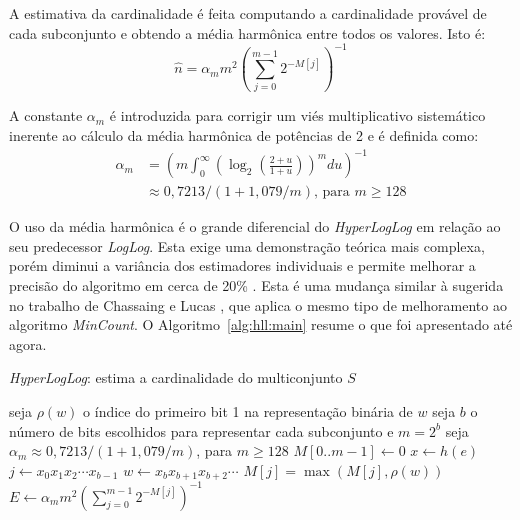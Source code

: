 A estimativa da cardinalidade é feita computando a cardinalidade provável de cada subconjunto e obtendo a média harmônica entre todos os valores. Isto é:
\[
    \hat{n} = \alpha_m m^2 \left(\sum_{j=0}^{m-1} 2^{-M[j]}\right)^{-1}
\]

A constante $\alpha_m$ é introduzida para corrigir um viés multiplicativo sistemático inerente ao cálculo da média harmônica de potências de 2 e é definida como:
\begin{align*}
    \alpha_m & = \left( m \int_0^\infty \left( \log_2 \left( \frac{2+u}{1+u} \right) \right)^m du \right) ^ {-1} \\
             & \approx  0,7213/(1+ 1,079/m) \text{, para } m \geq 128
\end{align*}

O uso da média harmônica é o grande diferencial do \emph{HyperLogLog} em relação ao seu predecessor \emph{LogLog}. Esta exige uma demonstração teórica mais complexa, porém diminui a variância dos estimadores individuais e permite melhorar a precisão do algoritmo em cerca de 20\% \cite{flajolet2008hyperloglog}. Esta é uma mudança similar à sugerida no trabalho de Chassaing e Lucas \cite{chassaing2007efficient}, que aplica o mesmo tipo de melhoramento ao algoritmo \emph{MinCount}. O Algoritmo~\ref{alg:hll:main} resume o que foi apresentado até agora. 

\begin{algorithm}
\linespread{1}\selectfont
\caption{\emph{HyperLogLog}: estima a cardinalidade do multiconjunto $S$}
\label{alg:hll:main}
\begin{algorithmic}[1]
\State seja $\rho(w)$ o índice do primeiro bit 1 na representação binária de $w$
\State seja $b$ o número de bits escolhidos para representar cada subconjunto e $m=2^b$
\State seja $\alpha_m \approx 0,7213/(1 + 1,079/m)$, para $m \geq 128$
    \State $M[0..m-1] \gets 0$
        \State $x \gets h(e)$
        \State $j \gets x_0x_1x_2 \cdots x_{b-1}$
        \State $w \gets x_b x_{b+1}x_{b+2} \cdots$
        \State $M[j] = \max(M[j], \rho(w))$
    \EndFor
    \State $E \gets \alpha_m m^2 \left(\sum_{j=0}^{m-1} 2^{-M[j]}\right)^{-1}$
	  
	  
    \Else{ }
    \EndIf
\EndFunction
\end{algorithmic}
\end{algorithm}

